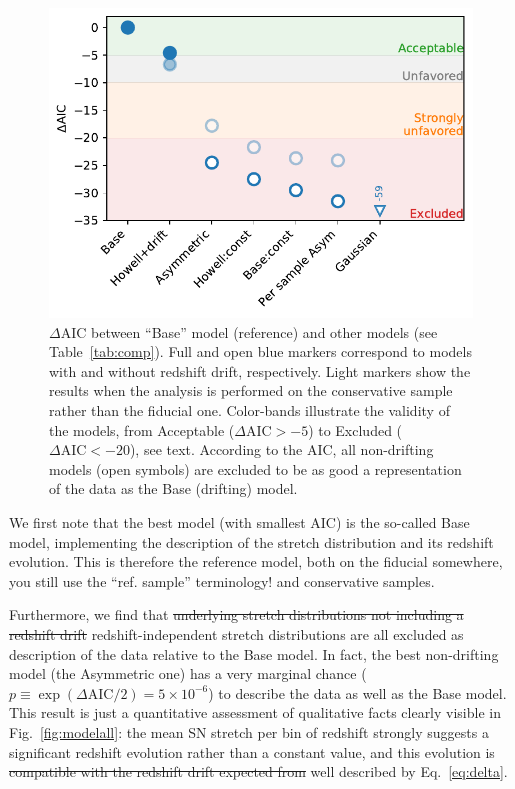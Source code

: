 \documentclass[]{aa} %
\newcommand{\yc}[1]{{\textcolor{BrickRed}{#1}}}
\begin{document}
\begin{figure}
    \centering
    \includegraphics[width=\linewidth]{Article_figures/mod_comp.pdf}
    \caption{$\Delta$AIC between ``Base'' model (reference) and other models
        (see Table~\ref{tab:comp}). Full and open blue markers correspond to
        models with and without redshift drift, respectively. Light markers show
        the results when the analysis is performed on the conservative sample
        rather than the fiducial one.  Color-bands illustrate the validity of
        the models, from  Acceptable ($\Delta\mathrm{AIC} > -5$) to Excluded
        ($\Delta\mathrm{AIC} < -20$), see text. According to the AIC, all
    non-drifting models (open symbols) are excluded to be as good a representation
of the data as the Base (drifting) model.}
    \label{fig:mod_comp}
\end{figure}

We first note that the best model (with smallest AIC) is the so-called Base
model, implementing the \cite{rigault2018} description of the stretch
distribution and its redshift evolution. This is therefore the reference model,
both on the fiducial \yc{somewhere, you still use the ``ref. sample'' terminology!} and conservative samples.

Furthermore, we find that \yc{\sout{underlying stretch distributions not including a
redshift drift} redshift-independent stretch distributions} are all excluded as description of the data relative to the Base
model. In fact, the best non-drifting model (the Asymmetric one) has a very marginal
chance ($p \equiv \exp\left(\Delta\mathrm{AIC}/2\right) = 5\times10^{-6}$) to
describe the data as well as the Base model. This result is just a quantitative
assessment of qualitative facts clearly visible in Fig.~\ref{fig:modelall}: the
mean SN stretch per bin of redshift strongly suggests \yc{a significant} redshift evolution
rather than a constant value, and this evolution is \yc{\sout{compatible with the
redshift drift expected from} well described by}  Eq.~\ref{eq:delta}.
\end{document}
